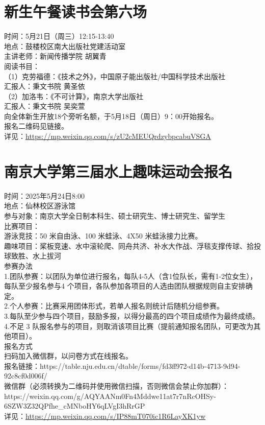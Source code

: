 \documentclass[letterpaper, 12pt]{article}
\begin{document}
\begin{multicols}{2}
\section{新生午餐读书会第六场} %
时间：5月21日（周三）12:15-13:40
\\地点：鼓楼校区南大出版社党建活动室
\\主讲老师：新闻传播学院 胡翼青
\\阅读书目：
\\（1）克劳福德：《技术之外》，中国原子能出版社/中国科学技术出版社
\\汇报人：秉文书院 黄圣依
\\（2）加洛韦：《不可计算》，南京大学出版社
\\汇报人：秉文书院 吴奕萱
\\向全体新生开放18个旁听名额，于5月18日（周日）9：00开始报名。
\\报名二维码见链接。
\\详见：\url{https://mp.weixin.qq.com/s/zU2cMEUQrdzybpcabuVSGA}
\section{南京大学第三届水上趣味运动会报名} %
时间：2025年5月24日8:00
\\地点：仙林校区游泳馆
\\参与对象：南京大学全日制本科生、硕士研究生、博士研究生、留学生
\\比赛项目：
\\游泳竞技：50 米自由泳、100 米蛙泳、4X50 米蛙泳接力比赛。
\\趣味项目：桨板竞速、水中滚轮爬、同舟共济、补水大作战、浮毯支撑传球、拾投球致胜、水上拔河
\\参赛办法
\\1.团队参赛：以团队为单位进行报名，每队4-5人（含1位队长，需有1-2位女生），每队至少报名参与4 个项目，各队参加各项目的人选由团队根据规则自主安排确定。
\\2.个人参赛：比赛采用团体形式，若单人报名则统计后随机分组参赛。
\\3.每队至少参与四个项目，鼓励多报，以得分最高的四个项目成绩作为最终成绩。
\\4.不足 3 队报名参与的项目，则取消该项目比赛（提前通知报名团队，可更改为其他项目）。
\\报名方式
\\扫码加入微信群，以问卷方式在线报名。
\\报名链接：https://table.nju.edu.cn/dtable/forms/fd3ff972-d14b-4713-9d94-92c8cf0d006f/
\\微信群（必须转换为二维码并使用微信扫描，否则微信会禁止你加群）：https://weixin.qq.com/g/AQYAANm0Fn4Mddwe11at7r7nRcOHSy-6SZW3Z32QPfhe\_cMNboHY6qLVgI3hRrGP
\\详见：\url{https://mp.weixin.qq.com/s/IP88mT070ic1R6LayXK1yw}


\end{multicols}
\end{document}
